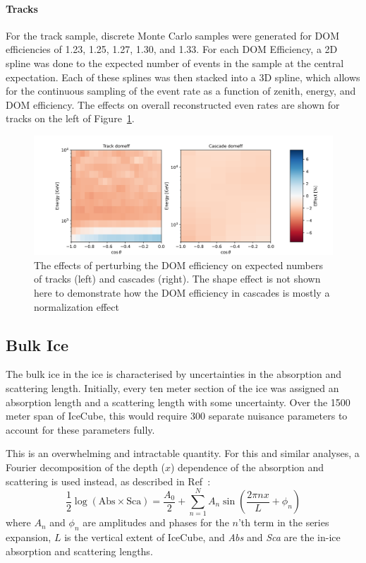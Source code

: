 \documentclass[main.tex]{subfiles}
\begin{document}
\paragraph{Tracks}

For the track sample, discrete Monte Carlo samples were generated for DOM efficiencies of 1.23, 1.25, 1.27, 1.30, and 1.33. 
For each DOM Efficiency, a 2D spline was done to the expected number of events in the sample at the central expectation. 
Each of these splines was then stacked into a 3D spline, which allows for the continuous sampling of the event rate as a function of zenith, energy, and DOM efficiency. 
The effects on overall reconstructed even rates are shown for tracks on the left of Figure~\ref{fig:domeff_analysis}.

\begin{figure}
    \centering
    \includegraphics[width=0.8\linewidth]{figures/systematics/domeff.png}
    \caption{The effects of perturbing the DOM efficiency on expected numbers of tracks (left) and cascades (right). The shape effect is not shown here to demonstrate how the DOM efficiency in cascades is mostly a normalization effect}\label{fig:domeff_analysis}
\end{figure}

\subsection{Bulk Ice}\label{sec:bulk}

The bulk ice in the ice is characterised by uncertainties in the absorption and scattering length. 
Initially, every ten meter section of the ice was assigned an absorption length and a scattering length with some uncertainty. 
Over the 1500 meter span of IceCube, this would require 300 separate nuisance parameters to account for these parameters fully.

This is an overwhelming and intractable quantity. 
For this and similar analyses, a Fourier decomposition of the depth ($x$) dependence of the absorption and scattering is used instead, as described in Ref~\cite{Aartsen_2019_snow}: 
\begin{equation}
    \dfrac{1}{2}\log\left(\text{Abs} \times \text{Sca}\right) = \dfrac{A_{0}}{2} +\sum\limits_{n=1}^{N}A_{n} \sin\left(\dfrac{2\pi nx}{L} + \phi_{n}\right)
\end{equation}
where $A_{n}$ and $\phi_{n}$ are amplitudes and phases for the $n$'th term in the series expansion, $L$ is the vertical extent of IceCube, and \textit{Abs} and \textit{Sca} are the in-ice absorption and scattering lengths. 
\end{document}
